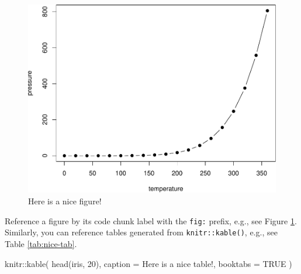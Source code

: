 \documentclass[
]{book}
\newenvironment{Shaded}{\begin{snugshade}}{\end{snugshade}}
\newcommand{\AttributeTok}[1]{\textcolor[rgb]{0.77,0.63,0.00}{#1}}
\newcommand{\ConstantTok}[1]{\textcolor[rgb]{0.00,0.00,0.00}{#1}}
\newcommand{\DecValTok}[1]{\textcolor[rgb]{0.00,0.00,0.81}{#1}}
\newcommand{\FunctionTok}[1]{\textcolor[rgb]{0.00,0.00,0.00}{#1}}
\newcommand{\NormalTok}[1]{#1}
\newcommand{\SpecialCharTok}[1]{\textcolor[rgb]{0.00,0.00,0.00}{#1}}
\newcommand{\StringTok}[1]{\textcolor[rgb]{0.31,0.60,0.02}{#1}}
\begin{document}
\begin{figure}

{\centering \includegraphics[width=0.8\linewidth]{ReadingNotes_files/figure-latex/nice-fig-1} 

}

\caption{Here is a nice figure!}\label{fig:nice-fig}
\end{figure}

Reference a figure by its code chunk label with the \texttt{fig:} prefix, e.g., see Figure \ref{fig:nice-fig}. Similarly, you can reference tables generated from \texttt{knitr::kable()}, e.g., see Table \ref{tab:nice-tab}.

\begin{Shaded}
\begin{Highlighting}[]
\NormalTok{knitr}\SpecialCharTok{::}\FunctionTok{kable}\NormalTok{(}
  \FunctionTok{head}\NormalTok{(iris, }\DecValTok{20}\NormalTok{), }\AttributeTok{caption =} \StringTok{\textquotesingle{}Here is a nice table!\textquotesingle{}}\NormalTok{,}
  \AttributeTok{booktabs =} \ConstantTok{TRUE}
\NormalTok{)}
\end{Highlighting}
\end{Shaded}
\end{document}

